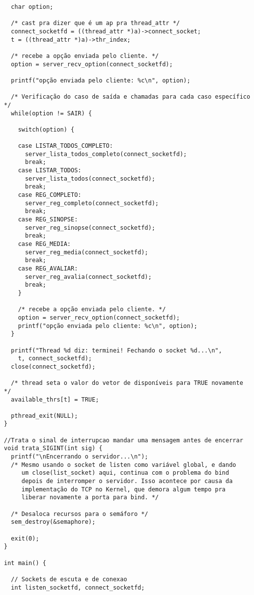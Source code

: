\documentclass[11pt,twoside]{article}
\begin{document}
\begin{verbatim}
  char option;

  /* cast pra dizer que é um ap pra thread_attr */
  connect_socketfd = ((thread_attr *)a)->connect_socket;
  t = ((thread_attr *)a)->thr_index;

  /* recebe a opção enviada pelo cliente. */
  option = server_recv_option(connect_socketfd);
	
  printf("opção enviada pelo cliente: %c\n", option);

  /* Verificação do caso de saída e chamadas para cada caso específico */
  while(option != SAIR) {
      
    switch(option) {
			
    case LISTAR_TODOS_COMPLETO:
      server_lista_todos_completo(connect_socketfd);
      break;
    case LISTAR_TODOS:
      server_lista_todos(connect_socketfd);
      break;
    case REG_COMPLETO:
      server_reg_completo(connect_socketfd);
      break;
    case REG_SINOPSE:
      server_reg_sinopse(connect_socketfd);
      break;
    case REG_MEDIA:
      server_reg_media(connect_socketfd);
      break;
    case REG_AVALIAR:
      server_reg_avalia(connect_socketfd);
      break;
    }

    /* recebe a opção enviada pelo cliente. */
    option = server_recv_option(connect_socketfd);
    printf("opção enviada pelo cliente: %c\n", option);
  }
	
  printf("Thread %d diz: terminei! Fechando o socket %d...\n",
    t, connect_socketfd);
  close(connect_socketfd);

  /* thread seta o valor do vetor de disponíveis para TRUE novamente */
  available_thrs[t] = TRUE;

  pthread_exit(NULL);
}

//Trata o sinal de interrupcao mandar uma mensagem antes de encerrar
void trata_SIGINT(int sig) {
  printf("\nEncerrando o servidor...\n");
  /* Mesmo usando o socket de listen como variável global, e dando
     um close(list_socket) aqui, continua com o problema do bind
     depois de interromper o servidor. Isso acontece por causa da
     implementação do TCP no Kernel, que demora algum tempo pra
     liberar novamente a porta para bind. */

  /* Desaloca recursos para o semáforo */
  sem_destroy(&semaphore);

  exit(0);
}

int main() {

  // Sockets de escuta e de conexao
  int listen_socketfd, connect_socketfd; 


\end{verbatim}
\end{document}
